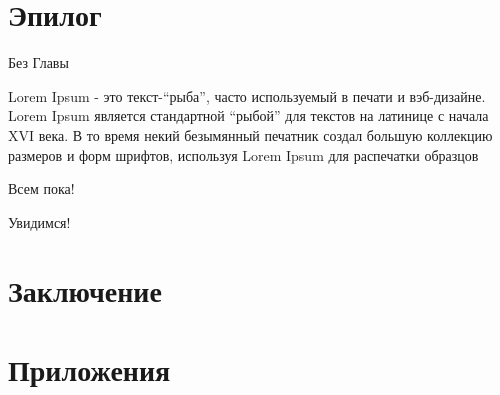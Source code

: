 \documentclass[
  12pt,
  a4paper,
]{book}
\theoremstyle{definition}
\theoremstyle{definition}
\theoremstyle{definition}
\theoremstyle{definition}
\theoremstyle{remark}
\begin{document}
\chapter*{Эпилог}\label{epilog}

Без Главы

Lorem Ipsum - это текст-``рыба'', часто используемый в печати и вэб-дизайне. Lorem Ipsum является стандартной ``рыбой'' для текстов на латинице с начала XVI века. В то время некий безымянный печатник создал большую коллекцию размеров и форм шрифтов, используя Lorem Ipsum для распечатки образцов

Всем пока!

Увидимся!

\chapter*{Заключение}\label{conclusion}

\chapter*{Приложения}\label{appendix}

  
\end{document}
